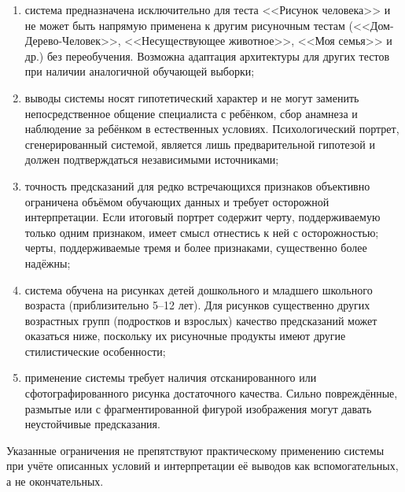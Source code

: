 \begin{enumerate}
    \item система предназначена исключительно для теста <<Рисунок человека>> и не может быть напрямую применена к другим рисуночным тестам (<<Дом-Дерево-Человек>>, <<Несуществующее животное>>, <<Моя семья>> и др.) без переобучения. Возможна адаптация архитектуры для других тестов при наличии аналогичной обучающей выборки;
    \item выводы системы носят гипотетический характер и не могут заменить непосредственное общение специалиста с ребёнком, сбор анамнеза и наблюдение за ребёнком в естественных условиях. Психологический портрет, сгенерированный системой, является лишь предварительной гипотезой и должен подтверждаться независимыми источниками;
    \item точность предсказаний для редко встречающихся признаков объективно ограничена объёмом обучающих данных и требует осторожной интерпретации. Если итоговый портрет содержит черту, поддерживаемую только одним признаком, имеет смысл отнестись к ней с осторожностью; черты, поддерживаемые тремя и более признаками, существенно более надёжны;
    \item система обучена на рисунках детей дошкольного и младшего школьного возраста (приблизительно 5--12 лет). Для рисунков существенно других возрастных групп (подростков и взрослых) качество предсказаний может оказаться ниже, поскольку их рисуночные продукты имеют другие стилистические особенности;
    \item применение системы требует наличия отсканированного или сфотографированного рисунка достаточного качества. Сильно повреждённые, размытые или с фрагментированной фигурой изображения могут давать неустойчивые предсказания.
\end{enumerate}

Указанные ограничения не препятствуют практическому применению системы при учёте описанных условий и интерпретации её выводов как вспомогательных, а не окончательных.

